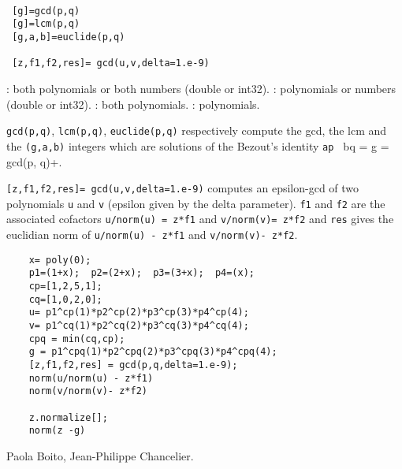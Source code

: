\begin{mandesc}
  \\
  \\
  \\
\end{mandesc}
\begin{calling_sequence}
\begin{verbatim}
 [g]=gcd(p,q)  
 [g]=lcm(p,q)  
 [g,a,b]=euclide(p,q)

 [z,f1,f2,res]= gcd(u,v,delta=1.e-9)
\end{verbatim}
\end{calling_sequence}
\begin{parameters}
  \begin{varlist}
    : both polynomials or both numbers (double or int32).
    : polynomials or numbers (double or int32).
    : both polynomials. 
    : polynomials. 
  \end{varlist}
\end{parameters}
\begin{mandescription}
  \verb+gcd(p,q)+, \verb+lcm(p,q)+, \verb+euclide(p,q)+ respectively compute 
  the gcd, the lcm and the \verb+(g,a,b)+ integers which are solutions of the 
  Bezout's identity \verb+ap + bq = g = gcd(p, q)+.
  
  \verb+[z,f1,f2,res]= gcd(u,v,delta=1.e-9)+ computes an epsilon-gcd of 
  two polynomials \verb+u+ and \verb+v+ (epsilon given by the delta parameter). 
  \verb+f1+ and \verb+f2+ are the associated cofactors \verb+u/norm(u) = z*f1+ and 
  \verb+v/norm(v)= z*f2+ and \verb+res+ gives the euclidian norm of \verb+u/norm(u) - z*f1+ 
  and \verb+v/norm(v)- z*f2+.
\end{mandescription}
\begin{examples}
  \begin{Verbatim}
    x= poly(0);
    p1=(1+x);  p2=(2+x);  p3=(3+x);  p4=(x);
    cp=[1,2,5,1];
    cq=[1,0,2,0];
    u= p1^cp(1)*p2^cp(2)*p3^cp(3)*p4^cp(4);
    v= p1^cq(1)*p2^cq(2)*p3^cq(3)*p4^cq(4);
    cpq = min(cq,cp);
    g = p1^cpq(1)*p2^cpq(2)*p3^cpq(3)*p4^cpq(4);
    [z,f1,f2,res] = gcd(p,q,delta=1.e-9);
    norm(u/norm(u) - z*f1)
    norm(v/norm(v)- z*f2)

    z.normalize[];
    norm(z -g) 
  \end{Verbatim}
\end{examples}
\begin{manseealso}
\end{manseealso}
\begin{authors}
  Paola Boito, Jean-Philippe Chancelier.
\end{authors}

